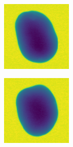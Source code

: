 \documentclass[11pt]{article}
\begin{document}
\begin{figure}[!h]
\begin{subfigure}[b]{0.22\textwidth}
         \caption{}
         \label{fig:perfect_35}
     \end{subfigure}
               \\
    \begin{subfigure}[b]{0.22\textwidth}
         \centering
         \includegraphics[width=\textwidth]{figurer/potato_dataset/perfect/perfect_36.jpg}
         \caption{}
         \label{fig:perfect_36}
     \end{subfigure}
     \hfill
     \begin{subfigure}[b]{0.22\textwidth}
         \centering
         \includegraphics[width=\textwidth]{figurer/potato_dataset/perfect/perfect_37.jpg}

\end{subfigure}
\end{figure}
\end{document}
